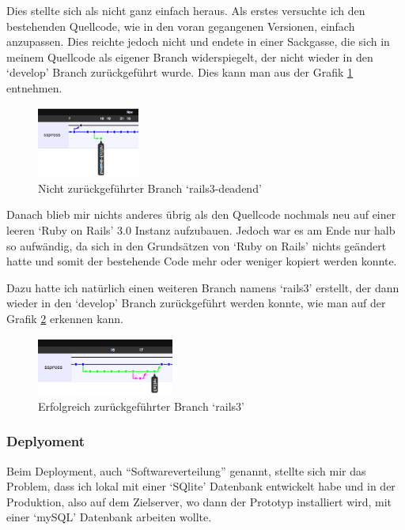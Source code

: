 Dies stellte sich als nicht ganz einfach heraus. Als erstes versuchte ich
den bestehenden Quellcode, wie in den voran gegangenen Versionen, einfach anzupassen.
Dies reichte jedoch nicht und endete in einer Sackgasse, die sich in meinem
Quellcode als eigener Branch widerspiegelt, der nicht wieder in den `develop'
Branch zurückgeführt wurde. Dies kann man aus der Grafik \ref{deadend} entnehmen.

\begin{figure}[ht]
    \begin{center}
        \includegraphics[width=0.3\textwidth,angle=0]{./bilder/deadend.png}
        \caption{Nicht zurückgeführter Branch `rails3-deadend'}
        \label{deadend}
    \end{center}
\end{figure}

Danach blieb mir nichts anderes übrig als den Quellcode nochmals neu auf einer
leeren `Ruby on Rails' 3.0 Instanz aufzubauen. Jedoch war es am Ende nur halb
so aufwändig, da sich in den Grundsätzen von `Ruby on Rails' nichts geändert 
hatte und somit der bestehende Code mehr oder weniger kopiert werden konnte.

Dazu hatte ich natürlich einen weiteren Branch namens `rails3' erstellt, der
dann wieder in den `develop' Branch zurückgeführt werden konnte, wie man
auf der Grafik \ref{rails3} erkennen kann.

\begin{figure}[ht]
    \begin{center}
        \includegraphics[width=0.4\textwidth,angle=0]{./bilder/rails3.png}
        \caption{Erfolgreich zurückgeführter Branch `rails3'}
        \label{rails3}
    \end{center}
\end{figure}

\clearpage

\subsubsection{Deplyoment}
Beim Deployment, auch ``Softwareverteilung'' \cite{deployment} genannt, stellte 
sich mir das Problem, dass ich lokal mit einer `SQlite' Datenbank entwickelt habe
und in der Produktion, also auf dem Zielserver, wo dann der Prototyp installiert
wird, mit einer `mySQL' Datenbank arbeiten wollte.

